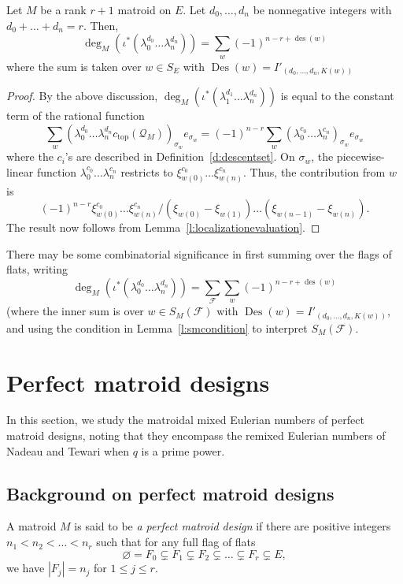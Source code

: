 \documentclass[ALCO,published]{cedram}
\numberwithin{equation}{section}
\numberwithin{figure}{section}
\newcommand{\cF}{\mathcal{F}}
\DeclareMathOperator{\Des}{Des}
\DeclareMathOperator{\des}{des}
\DeclareMathOperator{\topp}{top}
\begin{document}
\begin{theorem} \label{t:descentcounts}
  Let $M$ be a rank $r+1$ matroid on $E$. Let $d_0,\dots,d_{n}$ be nonnegative integers with $d_0+\dots+d_{n}=r$. Then,
  \[\deg_M(\iota^*(\lambda_0^{d_0}\dots\lambda_{n}^{d_n}))=\sum_w (-1)^{n-r+\des(w)}
  \]
  where the sum is taken over $w\in S_{E}$ with $\Des(w)=I'_{(d_0,\dots,d_n,K(w))}$
\end{theorem}



\begin{proof}
  By the above discussion,
  $\deg_M(\iota^*(\lambda_1^{d_1}\dots\lambda_{n}^{d_n}))$ is equal to the constant term of the rational function
   \[\sum_{w} (\lambda_0^{d_0}\dots\lambda_{n}^{d_{n}}c_{\topp}(\mathcal{Q}_M))_{\sigma_w}e_{\sigma_w}
   =(-1)^{n-r}\sum_{w} (\lambda_0^{c_0}\dots\lambda_{n}^{c_{n}})_{\sigma_w}e_{\sigma_w}\]
   where the $c_i$'s are described in Definition~\ref{d:descentset}.
  On $\sigma_{w}$, the piecewise-linear function $\lambda_0^{c_0}\dots\lambda_n^{c_n}$ restricts to 
  $\xi_{w(0)}^{c_0}\dots \xi_{w(n)}^{c_n}$.
  Thus, the contribution from $w$ is 
  \[(-1)^{n-r} \xi_{w(0)}^{c_0}\dots \xi_{w(n)}^{c_n}/(\xi_{w(0)}-\xi_{w(1)})\dots (\xi_{w(n-1)}-\xi_{w(n)}).\]
  The result now follows from Lemma~\ref{l:localizationevaluation}.
\end{proof}

There may be some combinatorial significance in first summing over the flags of flats, writing
  \[\deg_M(\iota^*(\lambda_0^{d_0}\dots\lambda_{n}^{d_n}))=\sum_\cF \sum_w (-1)^{n-r+\des(w)} 
  \]
(where the inner sum is over $w\in S_M(\cF)$ with $\Des(w)=I'_{(d_0,\dots,d_n,K(w))}$,
and using the condition in Lemma~\ref{l:smcondition} to interpret $S_M(\cF)$.



\section{Perfect matroid designs} \label{s:perfect}

In this section, we study the matroidal mixed Eulerian numbers of perfect matroid designs, noting that they encompass the remixed Eulerian numbers of Nadeau and Tewari \cite{NT:remixed} when $q$ is a prime power.

\subsection{Background on perfect matroid designs}
\begin{defi}
    A matroid $M$ is said to be {\em a perfect matroid design} if there are positive integers $n_1<n_2<\dots<n_r$ such that for any full flag of flats
    \[\varnothing=F_0 \subsetneq F_1\subsetneq F_2\subsetneq \dots\subsetneq F_r\subsetneq E,\]
    we have $|F_{j}|=n_j$ for $1\leq j\leq r$.
\end{defi}
\end{document}
